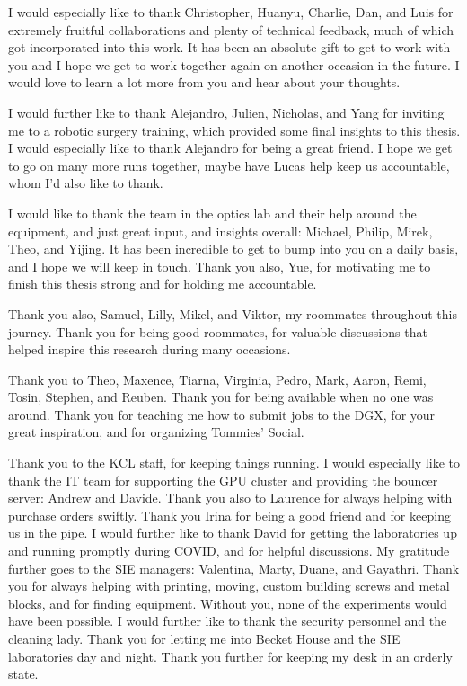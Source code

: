 I would especially like to thank Christopher, Huanyu, Charlie, Dan, and Luis for extremely fruitful collaborations and plenty of technical feedback, much of which got incorporated into this work. It has been an absolute gift to get to work with you and I hope we get to work together again on another occasion in the future. I would love to learn a lot more from you and hear about your thoughts.

I would further like to thank Alejandro, Julien, Nicholas, and Yang for inviting me to a robotic surgery training, which provided some final insights to this thesis. I would especially like to thank Alejandro for being a great friend. I hope we get to go on many more runs together, maybe have Lucas help keep us accountable, whom I'd also like to thank.

I would like to thank the team in the optics lab and their help around the equipment, and just great input, and insights overall: Michael, Philip, Mirek, Theo, and Yijing. It has been incredible to get to bump into you on a daily basis, and I hope we will keep in touch. Thank you also, Yue, for motivating me to finish this thesis strong and for holding me accountable.

Thank you also, Samuel, Lilly, Mikel, and Viktor, my roommates throughout this journey. Thank you for being good roommates, for valuable discussions that helped inspire this research during many occasions.

Thank you to Theo, Maxence, Tiarna, Virginia, Pedro, Mark, Aaron, Remi, Tosin, Stephen, and Reuben. Thank you for being available when no one was around. Thank you for teaching me how to submit jobs to the DGX, for your great inspiration, and for organizing Tommies' Social.

Thank you to the KCL staff, for keeping things running. I would especially like to thank the IT team for supporting the GPU cluster and providing the bouncer server: Andrew and Davide. Thank you also to Laurence for always helping with purchase orders swiftly. Thank you Irina for being a good friend and for keeping us in the pipe. I would further like to thank David for getting the laboratories up and running promptly during COVID, and for helpful discussions. My gratitude further goes to the SIE managers: Valentina, Marty, Duane, and Gayathri. Thank you for always helping with printing, moving, custom building screws and metal blocks, and for finding equipment. Without you, none of the experiments would have been possible. I would further like to thank the security personnel and the cleaning lady. Thank you for letting me into Becket House and the SIE laboratories day and night. Thank you further for keeping my desk in an orderly state.

